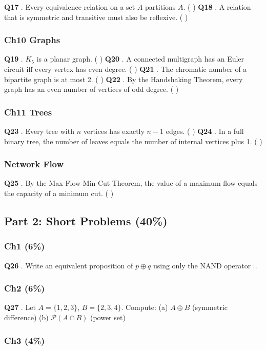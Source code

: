 \documentclass[10pt,a4paper,openany]{ctexbook}
\theoremstyle{definition}
\theoremstyle{remark}
\begin{document}
\textbf{Q17} . Every equivalence relation on a set $A$ partitions $A$. ( )
\textbf{Q18} . A relation that is symmetric and transitive must also be reflexive. ( )
\subsubsection{Ch10 Graphs}

\textbf{Q19} . $K_5$ is a planar graph. ( )
\textbf{Q20} . A connected multigraph has an Euler circuit iff every vertex has even degree. ( )
\textbf{Q21} . The chromatic number of a bipartite graph is at most 2. ( )
\textbf{Q22} . By the Handshaking Theorem, every graph has an even number of vertices of odd degree. ( )
\subsubsection{Ch11 Trees}

\textbf{Q23} . Every tree with $n$ vertices has exactly $n-1$ edges. ( )
\textbf{Q24} . In a full binary tree, the number of leaves equals the number of internal vertices plus 1. ( )
\subsubsection{Network Flow}

\textbf{Q25} . By the Max-Flow Min-Cut Theorem, the value of a maximum flow equals the capacity of a minimum cut. ( )
\vspace{-2pt}

\subsection{Part 2: Short Problems (40\%)}

\subsubsection{Ch1 (6\%)}

\textbf{Q26} . Write an equivalent proposition of $p \oplus q$ using only the NAND operator $|$.
\subsubsection{Ch2 (6\%)}

\textbf{Q27} . Let $A = \{1, 2, 3\}$, $B = \{2, 3, 4\}$. Compute:
(a) $A \oplus B$ (symmetric difference)
(b) $\mathcal{P}(A \cap B)$ (power set)
\subsubsection{Ch3 (4\%)}
\end{document}
